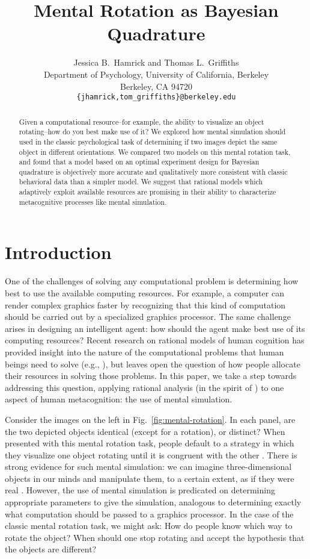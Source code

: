 \documentclass{article} %
\title{Mental Rotation as Bayesian Quadrature}
\author{Jessica B.~Hamrick and Thomas L.~Griffiths\\
  Department of Psychology, University of California, Berkeley\\
  Berkeley, CA 94720\\
  \texttt{\{jhamrick,tom\_griffiths\}@berkeley.edu}}
\begin{document}
\maketitle

\begin{abstract}
  Given a computational resource--for example, the ability to
  visualize an object rotating--how do you best make use of it? We
  explored how mental simulation should used in the classic
  psychological task of determining if two images depict the same
  object in different orientations. We compared two models on this
  mental rotation task, and found that a model based on an optimal
  experiment design for Bayesian quadrature is objectively more
  accurate and qualitatively more consistent with classic behavioral
  data than a simpler model. We suggest that rational models which
  adaptively exploit available resources are promising in their
  ability to characterize metacognitive processes like mental
  simulation.
\end{abstract}

\section{Introduction}

One of the challenges of solving any computational problem is
determining how best to use the available computing resources. For
example, a computer can render complex graphics faster by recognizing
that this kind of computation should be carried out by a specialized
graphics processor. The same challenge arises in designing an
intelligent agent: how should the agent make best use of its computing
resources? Recent research on rational models of human cognition has
provided insight into the nature of the computational problems that
human beings need to solve (e.g., \cite{Chater:1999wp,tenenbaumkgg11}),
but leaves open the question of how people allocate their resources in
solving those problems. In this paper, we take a step towards
addressing this question, applying rational analysis (in the spirit of
\cite{Marr:1983to,anderson90,Shepard:1987tt}) to one aspect of human
metacognition: the use of mental simulation.

Consider the images on the left in Fig.~\ref{fig:mental-rotation}. In
each panel, are the two depicted objects identical (except for a
rotation), or distinct? When presented with this mental rotation task,
people default to a strategy in which they visualize one object
rotating until it is congruent with the other
\cite{Shepard1971}. There is strong evidence for such mental
simulation: we can imagine three-dimensional objects in our minds and
manipulate them, to a certain extent, as if they were real
\cite{Kosslyn:2009tj}.  However, the use of mental simulation is
predicated on determining appropriate parameters to give the
simulation, analogous to determining exactly what computation should
be passed to a graphics processor.  In the case of the classic mental
rotation task, we might ask: How do people know which way to rotate
the object?  When should one stop rotating and accept the hypothesis
that the objects are different?
\end{document}
